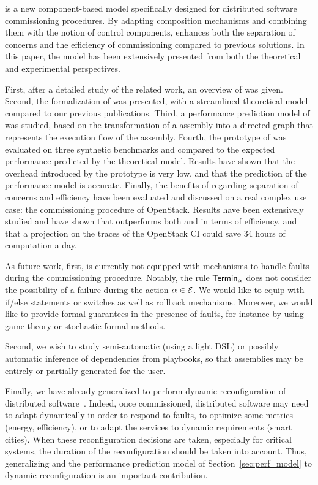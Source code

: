 \mad is a new component-based model specifically designed for
distributed software commissioning procedures. By adapting composition
mechanisms and combining them with the notion of control components,
\mad enhances both the separation of concerns and the efficiency of
commissioning compared to previous solutions. In this paper, the \mad
model has been extensively presented from both the theoretical and
experimental perspectives.

First, after a detailed study of the related work, an overview of \mad
was given. Second, the formalization of \mad was presented, with a
streamlined theoretical model compared to our previous
publications. Third, a performance prediction model of \mad was
studied, based on the transformation of a \mad assembly into a
directed graph that represents the execution flow of the
assembly. Fourth, the prototype of \mad was evaluated on three
synthetic benchmarks and compared to the expected performance
predicted by the theoretical model. Results have shown that the
overhead introduced by the prototype is very low, and that the
prediction of the performance model is accurate. Finally, the benefits
of \mad regarding separation of concerns and efficiency have been
evaluated and discussed on a real complex use case: the commissioning
procedure of OpenStack. Results have been extensively studied and have
shown that
\mad outperforms both \ansible and \aeolus in terms of efficiency, and that a 
projection on the traces of the OpenStack CI could save 34 hours of computation a 
day.

As future work, first, \mad is currently not equipped with mechanisms to handle faults during the commissioning procedure. Notably, the rule $\mathsf{Termin}_\alpha$
does not consider the possibility of a failure during the action
$\alpha \in \mathcal{E}$. We would like to equip \mad with if/else statements or switches as well as rollback mechanisms. Moreover, we would like to provide formal guarantees in the presence of faults, for instance by using game theory or stochastic formal methods.

Second, we wish to study semi-automatic (\eg using a light DSL) or possibly automatic inference of dependencies from \ansible playbooks, so that \mad assemblies may be entirely or partially generated for the user.

Finally, we have already generalized \mad to perform dynamic reconfiguration of distributed software~\cite{ccgridmaverick}. Indeed, once commissioned, distributed software may need to adapt dynamically in order to respond to faults, to optimize some metrics (\eg energy, efficiency), or to adapt the services to dynamic requirements (\eg smart cities). When these reconfiguration decisions are taken, especially for critical systems, the duration of the reconfiguration should be taken into account. Thus, generalizing \mad and the performance prediction model of Section~\ref{sec:perf_model} to dynamic reconfiguration is an important contribution.

  
